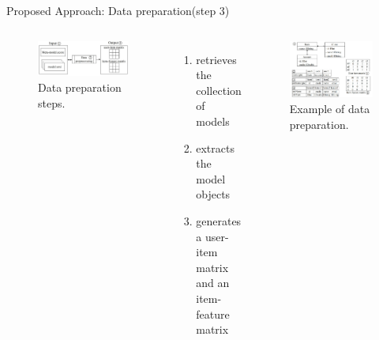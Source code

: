\documentclass{beamer}
\begin{document}
\begin{frame}{Proposed Approach: Data preparation(step 3)}
    \begin{columns}
        \begin{figure}[htbp]
            \centering
            \includegraphics[width = 0.8\linewidth]{pic/数据预处理.jpg}
            \caption{Data preparation steps.}
        \end{figure}
        \begin{enumerate}
            \item retrieves the collection of models
            \item extracts the model objects
            \item generates a user-item matrix and an item-feature matrix
        \end{enumerate}
        
        \begin{figure}[htbp]
            \centering
            \includegraphics[width = 1.1\linewidth]{pic/数据预处理例子.jpg}
            \caption{Example of data preparation.}
        \end{figure}
    \end{columns}
\end{frame}
    
\end{document}
